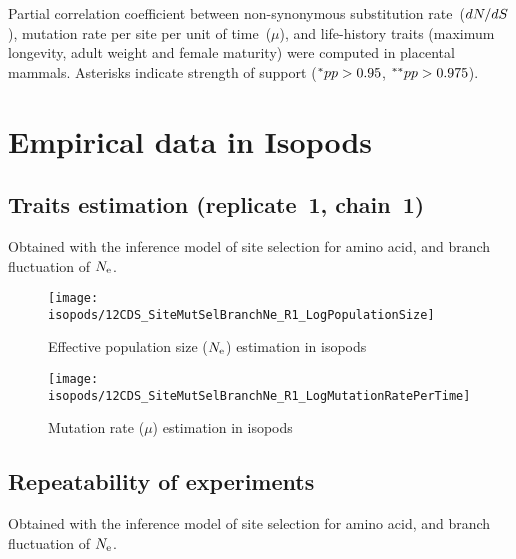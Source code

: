 \begin{table}[H]
    
    \caption[Partial correlation coefficient matrix in mammals ($\dnds$)]{
    Partial correlation coefficient between non-synonymous substitution rate~($\dnds$), mutation rate per site per unit of time~($\mu$), and life-history traits (maximum longevity, adult weight and female maturity) were computed in placental mammals.
    Asterisks indicate strength of support ($\smash{^{*}} pp > 0.95$, $\smash{^{**}} pp > 0.975$).}
\end{table}


\section{Empirical data in Isopods}
\label{sec:empirical-data-in-isopods}

\subsection{Traits estimation (replicate~1, chain~1)}
Obtained with the inference model of site selection for amino acid, and branch fluctuation of $\Ne$.

\begin{figure}[H]
    \centering
    \texttt{[image: isopods/12CDS\_SiteMutSelBranchNe\_R1\_LogPopulationSize]}
    \caption[$\Ne$ estimation in isopods]{Effective population size ($\Ne$) estimation in isopods}
\end{figure}

\begin{figure}[H]
    \centering
    \texttt{[image: isopods/12CDS\_SiteMutSelBranchNe\_R1\_LogMutationRatePerTime]}
    \caption[Mutation rate estimation in isopods]{Mutation rate ($\mu$) estimation in isopods}
\end{figure}

\subsection{Repeatability of experiments}
Obtained with the inference model of site selection for amino acid, and branch fluctuation of $\Ne$.

